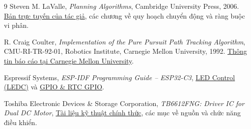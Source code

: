 \documentclass[12pt,a4paper,oneside]{report}
\begin{document}
\begin{thebibliography}{9}
Steven M. LaValle, \textit{Planning Algorithms}, Cambridge University Press, 2006.
\href{https://lavalle.pl/planning/}{Bản trực tuyến của tác giả}, các chương về quy hoạch chuyển động và ràng buộc vi phân.

R. Craig Coulter, \textit{Implementation of the Pure Pursuit Path Tracking Algorithm},
CMU-RI-TR-92-01, Robotics Institute, Carnegie Mellon University, 1992.
\href{https://publications.ri.cmu.edu/implementation-of-the-pure-pursuit-path-tracking-algorithm}{Thông tin báo cáo tại Carnegie Mellon University}.

Espressif Systems, \textit{ESP-IDF Programming Guide -- ESP32-C3},
\href{https://docs.espressif.com/projects/esp-idf/en/stable/esp32c3/api-reference/peripherals/ledc.html}{LED Control (LEDC)} và
\href{https://docs.espressif.com/projects/esp-idf/en/stable/esp32c3/api-reference/peripherals/gpio.html}{GPIO \& RTC GPIO}.

Toshiba Electronic Devices \& Storage Corporation, \textit{TB6612FNG: Driver IC for Dual DC Motor},
\href{https://toshiba.semicon-storage.com/info/TB6612FNG_datasheet_en_20141001.pdf?did=10660\&prodName=TB6612FNG}{Tài liệu kỹ thuật chính thức}, các mục về nguồn và chức năng điều khiển.
\end{thebibliography}
\end{document}

